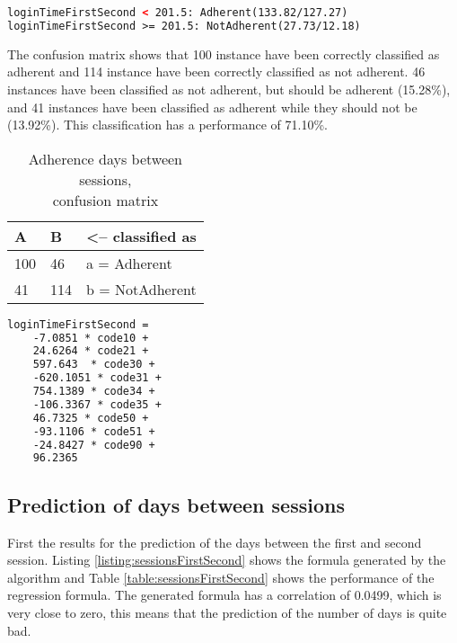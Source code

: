 \begin{lstlisting}[caption={Adherence days between sessions, BFTree decision tree}, label=listing:adherenceSessions, float=htpb, language=xml]
loginTimeFirstSecond < 201.5: Adherent(133.82/127.27)
loginTimeFirstSecond >= 201.5: NotAdherent(27.73/12.18)
\end{lstlisting}

The confusion matrix shows that 100 instance have been correctly classified as adherent and 114 instance have been correctly classified as not adherent. 46 instances have been classified as not adherent, but should be adherent (15.28\%), and 41 instances have been classified as adherent while they should not be (13.92\%). This classification has a performance of 71.10\%.

\begin{table}[]
	\centering
	\caption{Adherence days between sessions, \\confusion matrix}
	\label{table:adherenceSessionsMatrix}
	\begin{tabular}{@{}ll|l@{}}
		\toprule
		\textbf{A} & \textbf{B} & \textless-- classified as \\ \midrule
		100        & 46         & a = Adherent              \\
		41         & 114        & b = NotAdherent           \\ \bottomrule
	\end{tabular}
\end{table}

\begin{lstlisting}[caption={Formula prediction of days between session one and two}, label=listing:sessionsFirstSecond, float=h!tpb, language=xml]
loginTimeFirstSecond =
	-7.0851 * code10 +
	24.6264 * code21 +
	597.643  * code30 +
	-620.1051 * code31 +
	754.1389 * code34 +
	-106.3367 * code35 +
	46.7325 * code50 +
	-93.1106 * code51 +
	-24.8427 * code90 +
	96.2365
\end{lstlisting}

\subsection{Prediction of days between sessions}
First the results for the prediction of the days between the first and second session. Listing \ref{listing:sessionsFirstSecond} shows the formula generated by the  algorithm and Table \ref{table:sessionsFirstSecond} shows the performance of the regression formula. The generated formula has a correlation of 0.0499, which is very close to zero, this means that the prediction of the number of days is quite bad.

